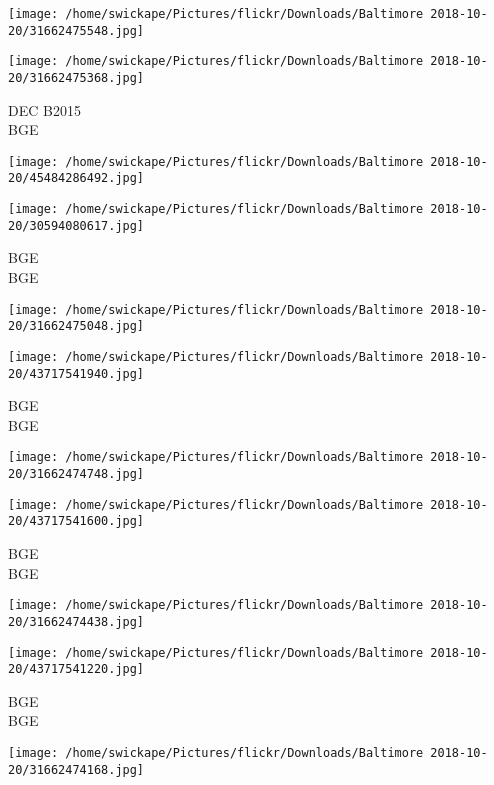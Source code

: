 \documentclass[10pt,letterpaper]{article}
\begin{document}
\texttt{[image: /home/swickape/Pictures/flickr/Downloads/Baltimore 2018-10-20/31662475548.jpg]}

\vspace{0.25in}
\texttt{[image: /home/swickape/Pictures/flickr/Downloads/Baltimore 2018-10-20/31662475368.jpg]}

DEC B2015\\
BGE\\
\pagebreak

\texttt{[image: /home/swickape/Pictures/flickr/Downloads/Baltimore 2018-10-20/45484286492.jpg]}

\vspace{0.25in}
\texttt{[image: /home/swickape/Pictures/flickr/Downloads/Baltimore 2018-10-20/30594080617.jpg]}

BGE\\
BGE\\
\pagebreak

\texttt{[image: /home/swickape/Pictures/flickr/Downloads/Baltimore 2018-10-20/31662475048.jpg]}

\vspace{0.25in}
\texttt{[image: /home/swickape/Pictures/flickr/Downloads/Baltimore 2018-10-20/43717541940.jpg]}

BGE\\
BGE\\
\pagebreak

\texttt{[image: /home/swickape/Pictures/flickr/Downloads/Baltimore 2018-10-20/31662474748.jpg]}

\vspace{0.25in}
\texttt{[image: /home/swickape/Pictures/flickr/Downloads/Baltimore 2018-10-20/43717541600.jpg]}

BGE\\
BGE\\
\pagebreak

\texttt{[image: /home/swickape/Pictures/flickr/Downloads/Baltimore 2018-10-20/31662474438.jpg]}

\vspace{0.25in}
\texttt{[image: /home/swickape/Pictures/flickr/Downloads/Baltimore 2018-10-20/43717541220.jpg]}

BGE\\
BGE\\
\pagebreak

\texttt{[image: /home/swickape/Pictures/flickr/Downloads/Baltimore 2018-10-20/31662474168.jpg]}
\end{document}
